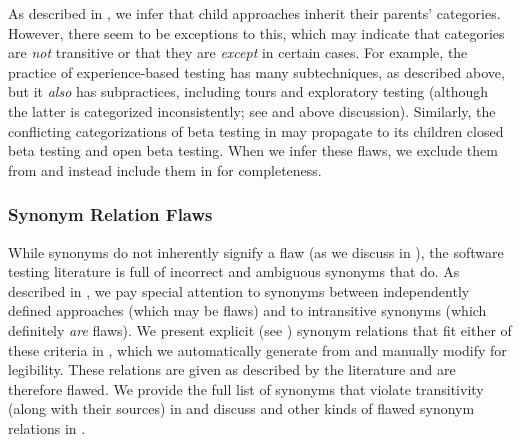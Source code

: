\ifnotpaper
    As described in , we infer that child approaches inherit their
    parents' categories. However, there seem to be exceptions to this, which
    may indicate that categories are \emph{not} transitive or that they are
    \emph{except} in certain cases. For example, the practice of experience-based
    testing has many subtechniques, as described above, but it \emph{also} has
    subpractices, including tours \citep[p.~34]{IEEE2022} and exploratory testing
    (although the latter is categorized inconsistently; see 
    and above discussion). Similarly, the conflicting categorizations of beta
    testing in  may propagate to its children closed beta
    testing and open beta testing. When we infer these flaws, we exclude them
    from  and instead include them in
     for completeness.
    \newpage
\fi

\subsubsection{Synonym Relation Flaws}\label{syns}

While synonyms do not inherently signify a flaw (as we discuss in
), the software testing literature is full of incorrect and
ambiguous synonyms that do. As described in , we pay
special attention to synonyms between independently defined approaches (which
may be flaws) and to intransitive synonyms (which definitely \emph{are} flaws).
\ifnotpaper We present explicit (see ) synonym relations that
    fit either of these criteria in \utd{}, which we
    automatically generate from \ourApproachGlossary{} and manually modify for
    legibility. These relations are given as described by the literature and are
    therefore flawed. We provide the full list of synonyms that violate
    transitivity (along with their sources) in  and discuss and
    other kinds of flawed synonym relations in .
\fi

